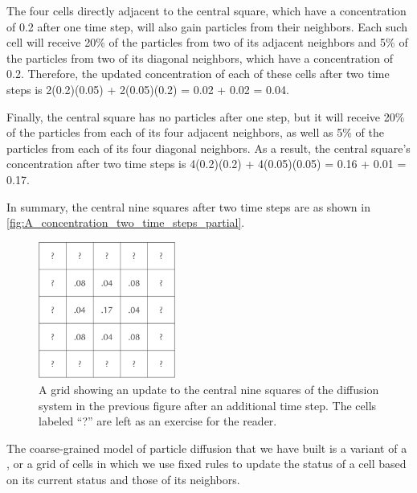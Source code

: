 The four cells directly adjacent to the central square, which have a concentration of 0.2 after one time step, will also gain particles from their neighbors. Each such cell will receive 20\% of the particles from two of its adjacent neighbors and 5\% of the particles from two of its diagonal neighbors, which have a concentration of 0.2. Therefore, the updated concentration of each of these cells after two time steps is 2(0.2)(0.05) + 2(0.05)(0.2) = 0.02 + 0.02 = 0.04.

Finally, the central square has no particles after one step, but it will receive 20\% of the particles from each of its four adjacent neighbors, as well as 5\% of the particles from each of its four diagonal neighbors. As a result, the central square's concentration after two time steps is 4(0.2)(0.2) + 4(0.05)(0.05) = 0.16 + 0.01 = 0.17.

In summary, the central nine squares after two time steps are as shown in \autoref{fig:A_concentration_two_time_steps_partial}.\\

\begin{figure}[h]
\centering
\mySfFamily
\includegraphics[width = 0.4\textwidth]{../images/A_concentration_two_time_steps_partial.png}
\caption{A grid showing an update to the central nine squares of the diffusion system in the previous figure after an additional time step. The cells labeled ``?'' are left as an exercise for the reader.}
\label{fig:A_concentration_two_time_steps_partial}
\end{figure}

\begin{qbox}\end{qbox}


The coarse-grained model of particle diffusion that we have built is a variant of a , or a grid of cells in which we use fixed rules to update the status of a cell based on its current status and those of its neighbors.\\

